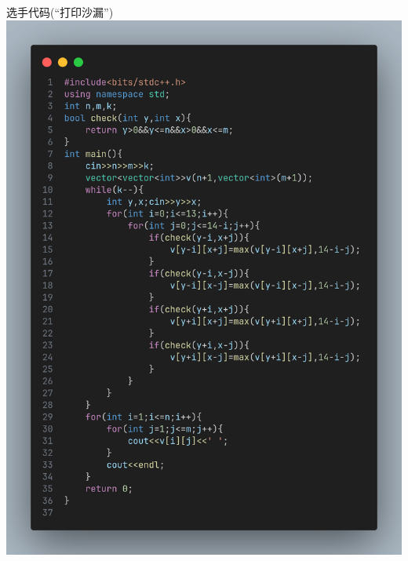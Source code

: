 \documentclass{beamer}
\begin{document}
    \begin{frame}{选手代码(“打印沙漏”)}
        \centering\includegraphics[scale=0.15]{images/std/C1.png}
    \end{frame}
\end{document}
